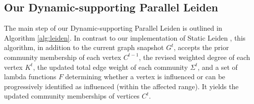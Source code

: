 \subsection{Our Dynamic-supporting Parallel Leiden}
\label{sec:our-leiden}

The main step of our Dynamic-supporting Parallel Leiden is outlined in Algorithm \ref{alg:leiden}. In contrast to our implementation of Static Leiden \cite{sahu2023gveleiden}, this algorithm, in addition to the current graph snapshot $G^t$, accepts the prior community membership of each vertex $C^{t-1}$, the revised weighted degree of each vertex $K^t$, the updated total edge weight of each community $\Sigma^t$, and a set of lambda functions $F$ determining whether a vertex is influenced or can be progressively identified as influenced (within the affected range). It yields the updated community memberships of vertices $C^t$.




